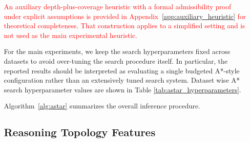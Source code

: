 \documentclass[11pt]{article}
\begin{document}
\textcolor{red}{An auxiliary depth-plus-coverage heuristic with a formal admissibility proof under explicit assumptions is provided in Appendix~\ref{app:auxiliary_heuristic} for theoretical completeness. That construction applies to a simplified setting and is not used as the main experimental heuristic.}



For the main experiments, we keep the search hyperparameters fixed across datasets to avoid over-tuning the search procedure itself. In particular, the reported results should be interpreted as evaluating a single budgeted A*-style configuration rather than an extensively tuned search system. Dataset wise A* search hyperparameter values are shown in Table \ref{tab:astar_hyperparameters}.

Algorithm~\ref{alg:astar} summarizes the overall inference procedure.



\subsection{Reasoning Topology Features}
\label{sec:topology_features}
\end{document}

